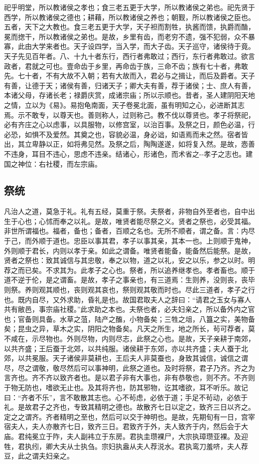 \documentclass[]{article}
\begin{document}
祀乎明堂，所以教诸侯之孝也；食三老五更于大学，所以教诸侯之弟也。祀先贤于西学，所以教诸侯之德也；耕藉，所以教诸侯之养也；朝觐，所以教诸侯之臣也。五者，天下之大教也。食三老五更于大学，天子袒而割牲，执酱而馈，执爵而酳，冕而揔干，所以教诸侯之弟也。是故，乡里有齿，而老穷不遗，强不犯弱，众不暴寡，此由大学来者也。天子设四学，当入学，而大子齿。天子巡守，诸侯待于竟。天子先见百年者。八、十九十者东行，西行者弗敢过；西行，东行者弗敢过。欲言政者，君就之可也。壹命齿于乡里，再命齿于族，三命不齿；族有七十者，弗敢先。七十者，不有大故不入朝；若有大故而入，君必与之揖让，而后及爵者。天子有善，让德于天；诸侯有善，归诸天子；卿大夫有善，荐于诸侯；士、庶人有善，本诸父母，存诸长老；禄爵庆赏，成诸宗庙；所以示顺也。昔者，圣人建阴阳天地之情，立以为《易》。易抱龟南面，天子卷冕北面，虽有明知之心，必进断其志焉。示不敢专，以尊天也。善则称人，过则称己。教不伐以尊贤也。孝子将祭祀，必有齐庄之心以虑事，以具服物，以修宫室，以治百事。及祭之日，颜色必温，行必恐，如惧不及爱然。其奠之也，容貌必温，身必诎，如语焉而未之然。宿者皆出，其立卑静以正，如将弗见然。及祭之后，陶陶遂遂，如将复入然。是故，悫善不违身，耳目不违心，思虑不违亲。结诸心，形诸色，而术省之-\/-孝子之志也。建国之神位：右社稷，而左宗庙。

\hypertarget{header-n651}{%
\subsection{祭统}\label{header-n651}}

凡治人之道，莫急于礼。礼有五经，莫重于祭。夫祭者，非物自外至者也，自中出生于心也；心怵而奉之以礼。是故，唯贤者能尽祭之义。贤者之祭也，必受其福。非世所谓福也。福者，备也；备者，百顺之名也。无所不顺者，谓之备。言：内尽于己，而外顺于道也。忠臣以事其君，孝子以事其亲，其本一也。上则顺于鬼神，外则顺于君长，内则以孝于亲。如此之谓备。唯贤者能备，能备然后能祭。是故，贤者之祭也：致其诚信与其忠敬，奉之以物，道之以礼，安之以乐，参之以时。明荐之而已矣。不求其为。此孝子之心也。祭者，所以追养继孝也。孝者畜也。顺于道不逆于伦，是之谓畜。是故，孝子之事亲也，有三道焉：生则养，没则丧，丧毕则祭。养则观其顺也，丧则观其哀也，祭则观其敬而时也。尽此三道者，孝子之行也。既内自尽，又外求助，昏礼是也。故国君取夫人之辞曰：``请君之玉女与寡人共有敝邑，事宗庙社稷。''此求助之本也。夫祭也者，必夫妇亲之，所以备外内之官也；官备则具备。水草之菹，陆产之醢，小物备矣；三牲之俎，八簋之实，美物备矣；昆虫之异，草木之实，阴阳之物备矣。凡天之所生，地之所长，茍可荐者，莫不咸在，示尽物也。外则尽物，内则尽志，此祭之心也。是故，天子亲耕于南郊，以共齐盛；王后蚕于北郊，以共纯服。诸侯耕于东郊，亦以共齐盛；夫人蚕于北郊，以共冕服。天子诸侯非莫耕也，王后夫人非莫蚕也，身致其诚信，诚信之谓尽，尽之谓敬，敬尽然后可以事神明，此祭之道也。及时将祭，君子乃齐。齐之为言齐也。齐不齐以致齐者也。是以君子非有大事也，非有恭敬也，则不齐。不齐则于物无防也，嗜欲无止也。及其将齐也，防其邪物，讫其嗜欲，耳不听乐。故记曰：``齐者不乐''，言不敢散其志也。心不茍虑，必依于道；手足不茍动，必依于礼。是故君子之齐也，专致其精明之德也。故散齐七日以定之，致齐三日以齐之。定之之谓齐。齐者精明之至也，然后可以交于神明也。是故，先期旬有一日，宫宰宿夫人，夫人亦散齐七日，致齐三日。君致齐于外，夫人致齐于内，然后会于大庙。君纯冕立于阼，夫人副袆立于东房。君执圭瓒裸尸，大宗执璋瓒亚裸。及迎牲，君执纼，卿大夫从士执刍。宗妇执盎从夫人荐涚水。君执鸾刀羞哜，夫人荐豆，此之谓夫妇亲之。
\end{document}
